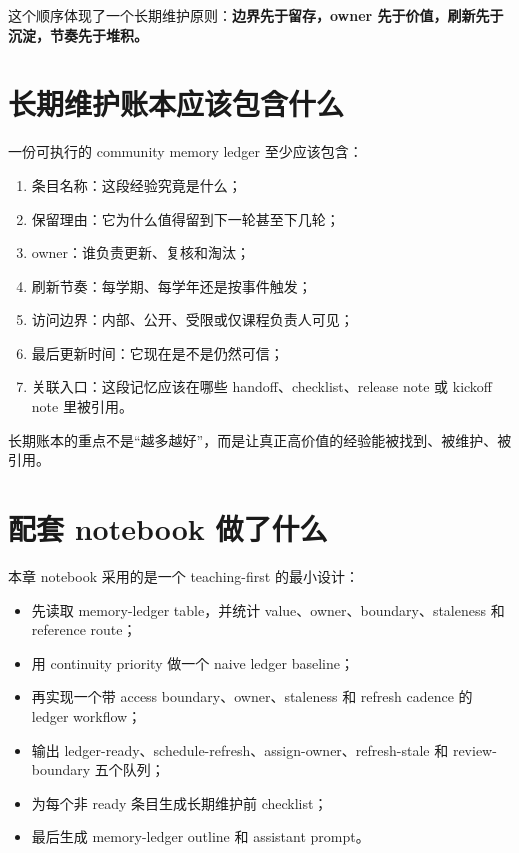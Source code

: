 这个顺序体现了一个长期维护原则：\textbf{边界先于留存，owner 先于价值，刷新先于沉淀，节奏先于堆积。}

\section{长期维护账本应该包含什么}

一份可执行的 community memory ledger 至少应该包含：

\begin{enumerate}
    \item 条目名称：这段经验究竟是什么；
    \item 保留理由：它为什么值得留到下一轮甚至下几轮；
    \item owner：谁负责更新、复核和淘汰；
    \item 刷新节奏：每学期、每学年还是按事件触发；
    \item 访问边界：内部、公开、受限或仅课程负责人可见；
    \item 最后更新时间：它现在是不是仍然可信；
    \item 关联入口：这段记忆应该在哪些 handoff、checklist、release note 或 kickoff note 里被引用。
\end{enumerate}

长期账本的重点不是“越多越好”，而是让真正高价值的经验能被找到、被维护、被引用。

\section{配套 notebook 做了什么}

本章 notebook 采用的是一个 teaching-first 的最小设计：

\begin{itemize}
    \item 先读取 memory-ledger table，并统计 value、owner、boundary、staleness 和 reference route；
    \item 用 continuity priority 做一个 naive ledger baseline；
    \item 再实现一个带 access boundary、owner、staleness 和 refresh cadence 的 ledger workflow；
    \item 输出 ledger-ready、schedule-refresh、assign-owner、refresh-stale 和 review-boundary 五个队列；
    \item 为每个非 ready 条目生成长期维护前 checklist；
    \item 最后生成 memory-ledger outline 和 assistant prompt。
\end{itemize}

